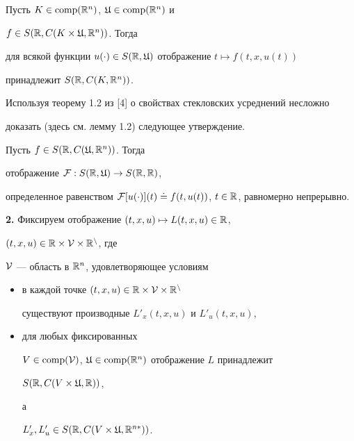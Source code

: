 \begin{lems}[{\myfont [4]}]


Пусть $K\in\operatorname{comp}(\Bbb R^n)$, $\frak U\in\operatorname{comp}(\Bbb R^n)$ и


$f\in S(\Bbb R,C(K\times\frak U,\Bbb R^n))$. Тогда


для всякой функции $u(\cdot)\in


S(\Bbb R,\frak U)$ отображение $t\mapsto f(t,x,u(t))$


принадлежит $S(\Bbb R,C(K,\Bbb R^n))$.


\end{lems}





Используя теорему 1.2 из [4] о свойствах стекловских усреднений несложно


доказать (здесь см. лемму 1.2) следующее утверждение.





\begin{lems}


Пусть $f\in S(\Bbb R,C(\frak U,\Bbb R^n))$. Тогда


отображение ${\cal F}:S(\Bbb R,\frak U)\to S(\Bbb R,\Bbb R)$,


определенное равенством ${\cal F}[u(\cdot)](t)\doteq


f(t,u(t))$, $t\in\Bbb R$, равномерно непрерывно.


\end{lems}





\addtocounter{section}{1}


\setcounter{equation}{0}


\setcounter{thms}{0}


\setcounter{lems}{0}








{\bf 2.} Фиксируем отображение $(t,x,u)\mapsto L(t,x,u)\in \Bbb R$,


$(t,x,u)\in\Bbb R\times\cal V\times\Bbb R^n$, где


$\cal V$ --- область в $\Bbb R^n$, удовлетворяющее условиям


\begin{itemize}


\item[1)] в каждой точке $(t,x,u)\in\Bbb R\times\cal V\times\Bbb R^n$


существуют производные $L'_x(t,x,u)$ и $L'_u(t,x,u)$,


\item[2)] для любых фиксированных


$V\in\operatorname{comp}(\cal V)$, $\frak U\in\operatorname{comp}(\Bbb R^n)$ отображение $L$ принадлежит


$S(\Bbb R,C(V\times\frak U,\Bbb R))$,


а


$L'_x,L'_u\in S(\Bbb R,C(V\times\frak U,\Bbb R^{n*}))$.


\end{itemize}





